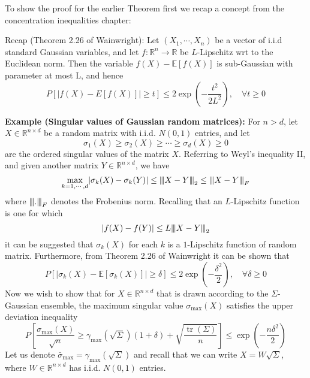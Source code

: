 \documentclass[10pt,handout,english]{beamer}
\DeclareMathOperator{\tr}{tr}
\newcommand{\E}{\mathbb{E}}
\newcommand{\R}{\mathbb{R}}
\newcommand{\vertiii}[1]{{\left\vert\kern-0.25ex\left\vert\kern-0.25ex\left\vert #1 
    \right\vert\kern-0.25ex\right\vert\kern-0.25ex\right\vert}}
\begin{document}
\begin{frame}[allowframebreaks]
To show the proof for the earlier Theorem first we recap a concept from the concentration inequalities chapter:
\begin{block}{Recap (Theorem 2.26 of Wainwright):}
Let $(X_1,\cdots,X_n)$ be a vector of i.i.d standard Gaussian variables, and let $f:\R^n\to\R$ be $L$-Lipschitz wrt to the Euclidean norm. Then the variable $f(X)-\E[f(X)]$ is sub-Gaussian with parameter at most L, and hence
 \[
P[\lvert f(X)-E[f(X)]\rvert\geq t]\leq2\exp\left(-\frac{t^2}{2L^2}\right),\quad \forall t\geq 0
\]
\end{block}

\textbf{Example (Singular values of Gaussian random matrices):} For $n > d$, let $X\in \R^{n\times d}$ be a random matrix with i.i.d. $N(0,1)$ entries, and let
\[
\sigma_1(X)\geq \sigma_2(X)\geq\cdots\geq\sigma_d(X)\geq 0 
\]
are the ordered singular values of the matrix $X$. Referring to Weyl's inequality II, and given another matrix $Y\in\R^{n\times d}$, we have
\[
\max_{k=1,\cdots,d}\lvert \sigma_k(X)-\sigma_k(Y)\rvert \leq \vertiii{X-Y}_2\leq\vertiii{X-Y}_F
\]
where $\vertiii{.}_F$ denotes the Frobenius norm. Recalling that an $L$-Lipschitz function is one for which
\[
\lvert f(X)-f(Y)\rvert\leq L\vertiii{X-Y}_2
\]
it can be suggested that $\sigma_k(X)$ for each $k$ is a $1$-Lipschitz function of random matrix.  Furthermore, from Theorem 2.26 of Wainwright it can be shown that
\[
P[\lvert\sigma_k(X)-\E[\sigma_k(X)]\rvert\geq \delta ]\leq2\exp\left(-\frac{\delta^2}{2}\right),\quad\forall \delta\geq 0
\]
Now we wish to show that for $X\in\R^{n\times d}$ that is drawn according to the $\Sigma$-Gaussian ensemble, the maximum singular value $\sigma_{\max}(X)$ satisfies the upper deviation inequality
 \[
P\left[\frac{\sigma_{\max}(X)}{\sqrt{n}}\geq\gamma_{\max}(\sqrt{\Sigma})(1+\delta)+\sqrt{\frac{\tr(\Sigma)}{n}}\right]\leq \exp\left(-\frac{n\delta^2}{2}\right)
\]
Let us denote $\bar{\sigma}_{\max}=\gamma_{\max}(\sqrt{\Sigma})$ and recall that we can write $X=W\sqrt{\Sigma}$, where $W\in\R^{n\times d}$ has i.i.d. $N(0,1)$ entries. 


\end{frame}
\end{document}
